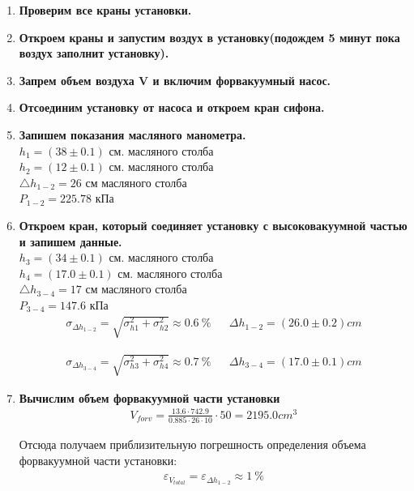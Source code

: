 \documentclass[a4paper, 12pt]{article}
\begin{document}
\begin{enumerate}	
\item \textbf{Проверим все краны установки.}
\item \textbf{Откроем краны и запустим воздух в установку(подождем 5 минут пока воздух заполнит установку).}
\item \textbf{Запрем объем воздуха V и включим форвакуумный насос.}	
\item \textbf{Отсоединим установку от насоса и откроем кран сифона.}
\item \textbf{Запишем показания масляного манометра.}\\ 

\noindent$h_1 = (38 \pm 0.1)$ см. масляного столба\\
$h_2 = (12 \pm 0.1)$ см. масляного столба\\
$\bigtriangleup h_{1-2} = 26$ см масляного столба \\
\bigskip $P_{1-2} =  225.78 $ кПа\\

\item \textbf{Откроем кран, который соединяет установку с высоковакуумной частью и запишем данные.}\\ 

\noindent$h_3 = (34 \pm 0.1)$ см. масляного столба\\
$h_4 = (17.0 \pm 0.1) $ см. масляного столба\\
$\bigtriangleup h_{3-4} = 17$ см масляного столба \\
$P_{3-4} =  147.6 $ кПа\\

\begin{align}
	\sigma_{\Delta h_{1-2}} = \sqrt{\sigma_{h1}^2 + \sigma_{h2}^2}\approx 0.6~\% & &
	\Delta h_{1-2} = (26.0 \pm 0.2)  cm
\end{align}

\begin{align}
	\sigma_{\Delta h_{3-4}} = \sqrt{\sigma_{h3}^2 + \sigma_{h4}^2}\approx 0.7~\% & &
	\Delta h_{3-4} = (17.0 \pm 0.1)  cm
\end{align}\bigskip

\item \textbf{Вычислим объем форвакуумной части установки}\\ 
\begin{align}
	V_{forv} = \frac{13.6 \cdot 742.9}{0.885\cdot 26 \cdot 10} \cdot 50 = 2195.0 cm^3
\end{align}

Отсюда получаем приблизительную погрешность определения  объема форвакуумной части установки:
\begin{align}
	\varepsilon_{V_{total}} = \varepsilon_{\Delta h_{1-2}} \approx 1~\%
\end{align}


\end{enumerate}
\end{document}
